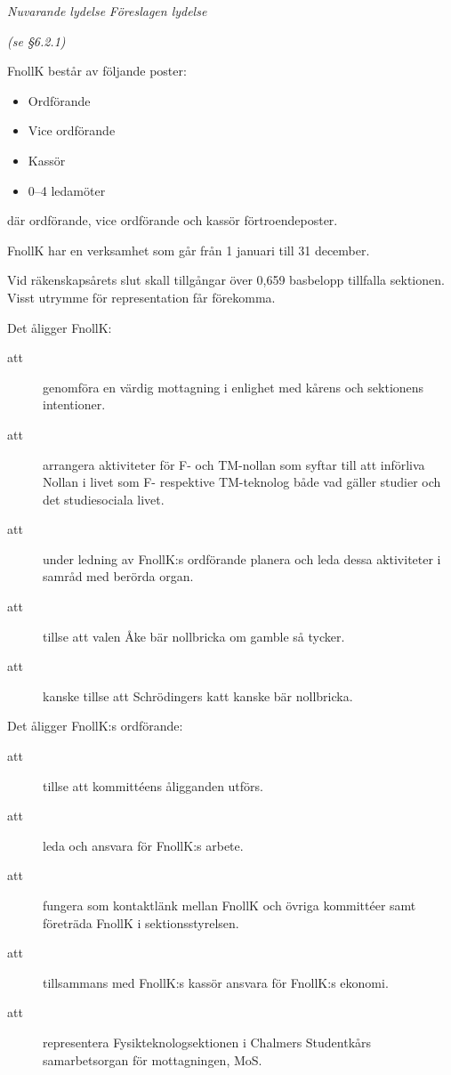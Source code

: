 \documentclass{article}
\newenvironment{lydelse}
    {\begin{paracol}{2}%
        \emph{Nuvarande lydelse}%
        \switchcolumn%
        \emph{Föreslagen lydelse}%
    \end{paracol}%
    \begin{enumerate}[label=\thesubsection.\arabic*]%
    \begin{paracol}{2}%
    }{\end{paracol}\end{enumerate}}
\begin{document}
\begin{lydelse}
    
    \item[] \emph{(se \S6.2.1)}
    
    \setcounter{section}{6}
    \setcounter{subsection}{5}
    
    \item FnollK består av följande poster:
	\begin{itemize}
		\item Ordförande
		\item Vice ordförande
		\item Kassör
		\item 0--4 ledamöter
	\end{itemize}
    där ordförande, vice ordförande och  kassör förtroendeposter.
    
    \item FnollK har en verksamhet som går från 1 januari till 31 december.

	\item Vid räkenskapsårets slut skall tillgångar över 0,659 basbelopp tillfalla sektionen. Visst utrymme för representation får förekomma.
    
    \item Det åligger FnollK:
	\begin{description}
		\item[att] genomföra en värdig mottagning i enlighet med kårens och sektionens intentioner.\vspace{0.8em}
		\item[att] arrangera aktiviteter för F- och TM-nollan som syftar till att införliva Nollan i livet som F- respektive TM-teknolog både vad gäller studier och det studiesociala livet.
		\item[att] under ledning av FnollK:s  ordförande planera och leda dessa aktiviteter i samråd med berörda organ.
		\item[att] tillse att valen Åke bär nollbricka om gamble så tycker.
		\item[att] kanske tillse att Schrödingers katt kanske bär nollbricka.
	\end{description}
    
    \vspace{0.3em}
    \item Det åligger FnollK:s ordförande:
	\begin{description}
		\item[att] tillse att kommittéens åligganden utförs.
		\item[att] leda och ansvara för FnollK:s arbete.
		\item[att] fungera som kontaktlänk mellan FnollK och övriga kommittéer samt företräda FnollK i sektionsstyrelsen.
		\item[att] tillsammans med FnollK:s kassör ansvara för FnollK:s ekonomi.
		\item[att] representera Fysikteknologsektionen i Chalmers Studentkårs samarbetsorgan för mottagningen, MoS.
	\end{description}
	

\end{lydelse}
\end{document}
